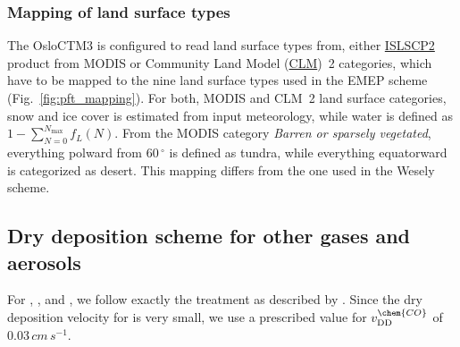 \documentclass[gmd, manuscript]{copernicus}
\begin{document}
\subsubsection*{Mapping of land surface types}
The OsloCTM3 is configured to read land surface types from, either \href{https://daac.ornl.gov/cgi-bin/dataset_lister.pl?p=29}{ISLSCP2} product from MODIS or Community Land Model (\href{http://www.cgd.ucar.edu/tss/clm/}{CLM})~2 categories, which have to be mapped to the nine land surface types used in the EMEP scheme (Fig.~\ref{fig:pft_mapping}). For both, MODIS and CLM~2 land surface categories, snow and ice cover is estimated from input meteorology, while water is defined as $1-\sum_{N=0}^{N_\text{max}} f_L(N)$. From the MODIS category \emph{Barren or sparsely vegetated}, everything polward from $60\,\unit{^\circ}$ is defined as tundra, while everything equatorward is categorized as desert. This mapping differs from the one used in the Wesely scheme.

\subsection{Dry deposition scheme for other gases and aerosols}
For , , and , we follow exactly the treatment as described by \citet{ACP:Simpson2012}. Since the dry deposition velocity for  is very small, we use a prescribed value for $v_\text{DD}^\chem{CO}$ of $0.03\,\unit{cm\,s^{-1}}$.
\end{document}
